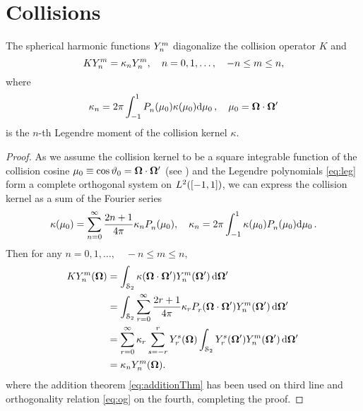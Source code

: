 \section{Collisions}
\begin{lemma}\label{lem:appC}
The spherical harmonic functions $\Y{n}{m}$ diagonalize the collision operator $K$ and
$$
	K\Y{n}{m} = \kappa_n \Y{n}{m},\quad n = 0,1,\ldots,\quad -n \leq m \leq n,
$$
where
$$
	\kappa_n = 2\pi \muint[_0]{\P{n}{}(\mu_0)\kappa(\mu_0)},\quad \mu_0 = \bomega\cdot\bomega'
$$
is the $n$-th Legendre moment of the collision kernel $\kappa$.
\end{lemma}  
\begin{proof}
	As we assume the collision kernel to be a square integrable function of the collision cosine  
	$\mu_0 \equiv \cos \polar_0 = \bomega\cdot\bomega'$ (see )
	and the Legendre polynomials \eqref{eq:leg} form a complete orthogonal system on $\Lp[2]([-1,1])$, we can express the
	collision kernel as a sum of the Fourier series
	$$
		\kappa(\mu_0) = \suma[n]{0}{\infty}\frac{2n+1}{4\pi}\kappa_n\P{n}{}(\mu_0),\quad
		\kappa_n = 2\pi \muint[_0]{\kappa(\mu_0)\P{n}{}(\mu_0)}.
	$$
	Then for any $n = 0,1,\ldots,\quad -n \leq m \leq n$,
	$$
\begin{aligned}
	K\Y{n}{m}(\bomega) &= \intA[']{\kappa(\bomega\cdot\bomega')\Y{n}{m}(\bomega')} \\
	&= \intA[']{\suma[r]{0}{\infty}\frac{2r+1}{4\pi}\kappa_r\P{r}{}(\bomega\cdot\bomega')\Y{n}{m}(\bomega')} \\
	&= \suma[r]{0}{\infty}\kappa_r\suma[s]{-r}{r}\Y{r}{s}(\bomega)\intA[']{\Y{r}{s}(\bomega')\Y{n}{m}(\bomega')} \\
	&= \kappa_n\Y{n}{m}(\bomega).
\end{aligned}
	$$
	where the addition theorem \eqref{eq:additionThm} has been used on third line and orthogonality relation \eqref{eq:og}
	on the fourth, completing the proof.
\end{proof}

